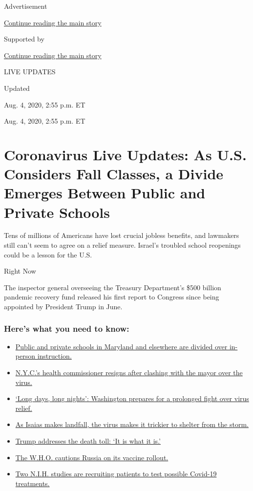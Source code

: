 Advertisement

\protect\hyperlink{after-top}{Continue reading the main story}

Supported by

\protect\hyperlink{after-sponsor}{Continue reading the main story}

LIVE UPDATES

Updated~

Aug. 4, 2020, 2:55 p.m. ET

Aug. 4, 2020, 2:55 p.m. ET

\hypertarget{coronavirus-live-updates-as-us-considers-fall-classes-a-divide-emerges-between-public-and-private-schools}{%
\section{Coronavirus Live Updates: As U.S. Considers Fall Classes, a
Divide Emerges Between Public and Private
Schools}\label{coronavirus-live-updates-as-us-considers-fall-classes-a-divide-emerges-between-public-and-private-schools}}

Tens of millions of Americans have lost crucial jobless benefits, and
lawmakers still can't seem to agree on a relief measure. Israel's
troubled school reopenings could be a lesson for the U.S.

Right Now

The inspector general overseeing the Treasury Department's \$500 billion
pandemic recovery fund released his first report to Congress since being
appointed by President Trump in June.

\hypertarget{heres-what-you-need-to-know}{%
\subsubsection{Here's what you need to
know:}\label{heres-what-you-need-to-know}}

\begin{itemize}
\tightlist
\item
  \protect\hyperlink{link-4825b93}{Public and private schools in
  Maryland and elsewhere are divided over in-person instruction.}
\item
  \protect\hyperlink{link-4d1eafa8}{N.Y.C.'s health commissioner resigns
  after clashing with the mayor over the virus.}
\item
  \protect\hyperlink{link-6b644638}{`Long days, long nights': Washington
  prepares for a prolonged fight over virus relief.}
\item
  \protect\hyperlink{link-5c0d6427}{As Isaias makes landfall, the virus
  makes it trickier to shelter from the storm.}
\item
  \protect\hyperlink{link-76dff678}{Trump addresses the death toll: `It
  is what it is.'}
\item
  \protect\hyperlink{link-27d0cbff}{The W.H.O. cautions Russia on its
  vaccine rollout.}
\item
  \protect\hyperlink{link-86f22d6}{Two N.I.H. studies are recruiting
  patients to test possible Covid-19 treatments.}
\end{itemize}

